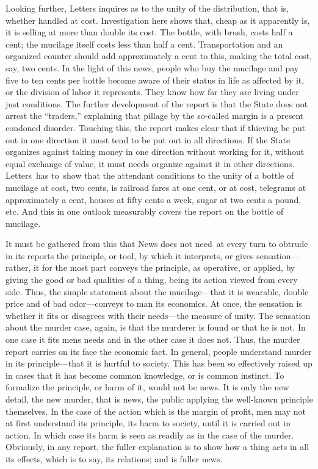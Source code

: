 \documentclass[twoside,symmetric,nobib,justified]{tufte-book}
\begin{document}
Looking further, Letters inquires as to the unity of the distribution,
that is, whether handled at cost. Investigation here shows that, cheap
as it apparently is, it is selling at more than double its cost. The
bottle, with brush, costs half a cent; the mucilage itself costs less
than half a cent. Transportation and an organized counter should add
approximately a cent to this, making the total cost, say, two cents. In
the light of this news, people who buy the mucilage and pay five to ten
cents per bottle become aware of their status in life as affected by it,
or the division of labor it represents. They know how far they are
living under just conditions. The further development of the report is
that the State does not arrest the ``traders,'' explaining that pillage
by the so-called margin is a present condoned disorder. Touching this,
the report makes clear that if thieving be put out in one direction it
must tend to be put out in all directions. If the State organizes
against taking money in one direction without working for it, without
equal exchange of value, it must needs organize against it in other
directions. Letters~has to~show that the attendant conditions to the
unity of a bottle of mucilage at cost, two cents, is railroad fares at
one cent, or at cost, telegrams at approximately a cent, houses at fifty
cents a week, sugar at two cents a pound, etc. And this in one outlook
measurably covers the report on the bottle of mucilage.~

It must be gathered from this that News does not need~at every turn to
obtrude in its reports the principle, or tool, by which it interprets,
or gives sensation---rather, it for the most part conveys the principle,
as operative, or applied, by giving the good or bad qualities of a
thing, being its action viewed from every side. Thus, the simple
statement about the mucilage---that it is wearable, double price and of
bad odor---conveys to man its economics. At once, the sensation is
whether it fits or disagrees with their needs---the measure of unity.
The sensation about the murder case, again, is that the murderer is
found or that he is not. In one case it fits men\textquotesingle s needs
and in the other case it does not. Thus, the murder report carries on
its face the economic fact. In general, people understand murder in its
principle---that it is hurtful to society. This has been so effectively
raised up in cases that it has become common knowledge, or is common
instinct. To formalize the principle, or harm of it, would not be news.
It is only the new detail, the new murder, that is news, the public
applying the well-known principle themselves. In the case of the action
which is the margin of profit, men may not at first understand its
principle, its harm to society, until it is carried out in action. In
which case its harm is seen as readily as in the case of the murder.
Obviously, in any report, the fuller explanation is to show how a thing
acts in all its effects, which is to say, its relations; and is fuller
news.~~
\end{document}
